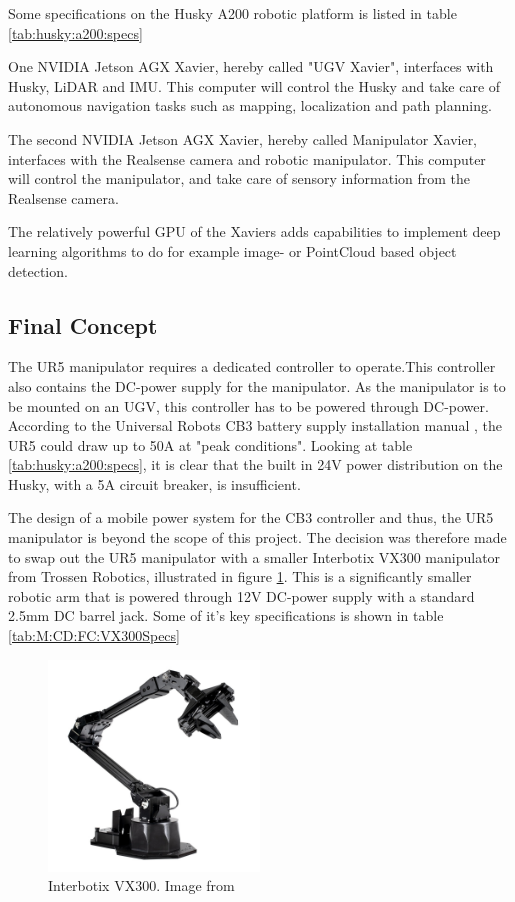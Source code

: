 Some specifications on the Husky A200 robotic platform is listed in table \ref{tab:husky:a200:specs}



One NVIDIA Jetson AGX Xavier, hereby called "UGV Xavier", interfaces with Husky, LiDAR and IMU. This computer will control the Husky and take care of autonomous navigation tasks such as mapping, localization and path planning. 

The second NVIDIA Jetson AGX Xavier, hereby called Manipulator Xavier, interfaces with the Realsense camera and robotic manipulator. This computer will control the manipulator, and take care of sensory information from the Realsense camera. 

The relatively powerful GPU of the Xaviers adds capabilities to implement deep learning algorithms to do for example image- or PointCloud based object detection.

\subsection{Final Concept}\label{sec:M:CD:FinalConcept}

The UR5 manipulator requires a dedicated controller to operate.This controller also contains the DC-power supply for the manipulator. As the manipulator is to be mounted on an UGV, this controller has to be powered through DC-power. According to the Universal Robots CB3 battery supply installation manual \cite{ur5_battery_manual}, the UR5 could draw up to 50A at "peak conditions". Looking at table \ref{tab:husky:a200:specs}, it is clear that the built in 24V power distribution on the Husky, with a 5A circuit breaker, is insufficient.

The design of a mobile power system for the CB3 controller and thus, the UR5 manipulator is beyond the scope of this project. The decision was therefore made to swap out the UR5 manipulator with a smaller Interbotix VX300 manipulator from Trossen Robotics, illustrated in figure \ref{fig:M:CD:FC:VX300}. This is a significantly smaller robotic arm that is powered through 12V DC-power supply with a standard 2.5mm DC barrel jack. Some of it's key specifications is shown in table \ref{tab:M:CD:FC:VX300Specs}

\begin{figure}[H]
    \centering
    \includegraphics[width = 0.5\textwidth]{Figures/VX300.jpg}
    \caption{Interbotix VX300. Image from \cite{interbotix_vx300}}
    \label{fig:M:CD:FC:VX300}
\end{figure}

